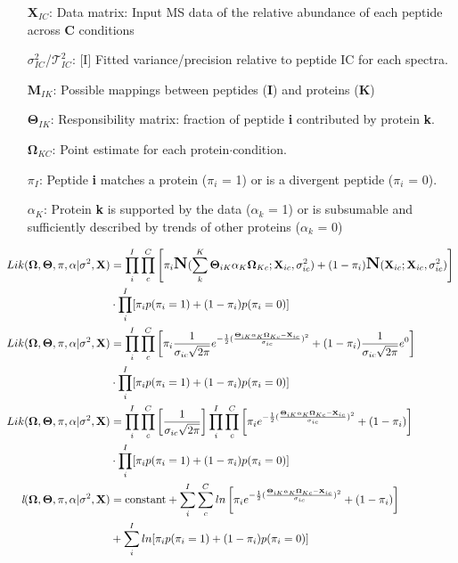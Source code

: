 \documentclass[12pt]{article}
\begin{document}
\begin{itemize}
\item[\textbf{X}$_{IC}$:] Data matrix: Input MS data of the relative abundance of each peptide across \textbf{C} conditions
\item[$\sigma^{2}_{IC}$/$\mathcal{T}^{2}_{IC}$:] [I] Fitted variance/precision relative to peptide IC for each spectra.
\item[\textbf{M}$_{IK}$:] Possible mappings between peptides (\textbf{I}) and proteins (\textbf{K})
\item[$\mathbf{\Theta}_{IK}$:] Responsibility matrix: fraction of peptide \textbf{i} contributed by protein \textbf{k}.
\item[$\mathbf{\Omega}_{KC}$:] Point estimate for each protein$\cdot$condition.
\item[$\pi_{I}$:] Peptide \textbf{i} matches a protein ($\pi_{i}$ = 1) or is a divergent peptide ($\pi_{i}$ = 0).
\item[$\alpha_{K}$:] Protein \textbf{k} is supported by the data ($\alpha_k$ = 1) or is subsumable and sufficiently described by trends of other proteins ($\alpha_{k}$ = 0)

\end{itemize}

\begin{align}
Lik(\mathbf{\Omega}, \mathbf{\Theta}, \pi, \alpha | \sigma^{2}, \textbf{X}) &= \prod_{i}^{I}\prod_{c}^{C}\left[ \pi_{i}\mbox{\Large \textbf{N}}(\sum_{k}^{K}\mathbf{\Theta}_{iK}\alpha_{K}\mathbf{\Omega}_{Kc} ; \textbf{X}_{ic}, \sigma^{2}_{ic}) + (1-\pi_{i})\mbox{\Large \textbf{N}}( \textbf{X}_{ic}; \textbf{X}_{ic}, \sigma^{2}_{ic}) \right] \notag\\
&\cdot \prod_{i}^{I}[\pi_{i}p(\pi_{i} = 1) + (1-\pi_{i})p(\pi_{i} = 0)]\notag\\
Lik(\mathbf{\Omega}, \mathbf{\Theta}, \pi, \alpha | \sigma^{2}, \textbf{X}) &= \prod_{i}^{I}\prod_{c}^{C}\left[\pi_{i}\frac{1}{\sigma_{ic}\sqrt{2\pi}}e^{-\frac{1}{2}(\frac{\mathbf{\Theta}_{iK}\alpha_{K}\mathbf{\Omega}_{Kc} - \textbf{X}_{ic}}{\sigma_{ic}})^2} + (1-\pi_{i})\frac{1}{\sigma_{ic}\sqrt{2\pi}}e^{0}\right]\notag\\
&\cdot \prod_{i}^{I}[\pi_{i}p(\pi_{i} = 1) + (1-\pi_{i})p(\pi_{i} = 0)]\notag\\
Lik(\mathbf{\Omega}, \mathbf{\Theta}, \pi, \alpha | \sigma^{2}, \textbf{X}) &= \prod_{i}^{I}\prod_{c}^{C}\left[\frac{1}{\sigma_{ic}\sqrt{2\pi}} \right] \prod_{i}^{I}\prod_{c}^{C}\left[\pi_{i}e^{-\frac{1}{2}(\frac{\mathbf{\Theta}_{iK}\alpha_{K}\mathbf{\Omega}_{Kc} - \textbf{X}_{ic}}{\sigma_{ic}})^2} + (1-\pi_{i})\right]\notag\\
&\cdot \prod_{i}^{I}[\pi_{i}p(\pi_{i} = 1) + (1-\pi_{i})p(\pi_{i} = 0)]\notag\\
\textit{l}(\mathbf{\Omega}, \mathbf{\Theta}, \pi, \alpha | \sigma^{2}, \textbf{X}) &= \text{constant} + \sum_{i}^{I}\sum_{c}^{C}ln\left[\pi_{i}e^{-\frac{1}{2}(\frac{\mathbf{\Theta}_{iK}\alpha_{K}\mathbf{\Omega}_{Kc} - \textbf{X}_{ic}}{\sigma_{ic}})^2} + (1-\pi_{i})\right]\notag\\
&+ \sum_{i}^{I}ln[\pi_{i}p(\pi_{i} = 1) + (1-\pi_{i})p(\pi_{i} = 0)]\notag\\
\end{align}
\end{document}
